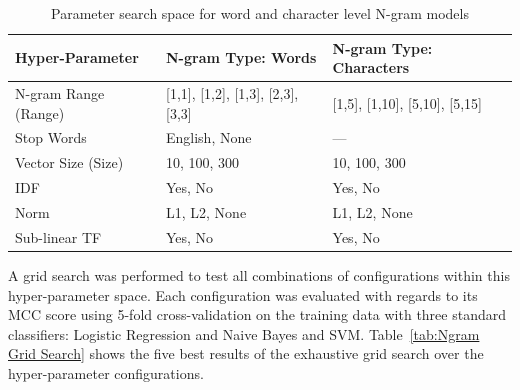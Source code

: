 \begin{table}[h]
  \begin{center}
  \begin{tabular}{ l l l}
    \toprule
    Hyper-Parameter & N-gram Type: Words & N-gram Type: Characters \\
    \midrule
    N-gram Range (Range) & [1,1], [1,2], [1,3], [2,3], [3,3] & [1,5], [1,10], [5,10], [5,15] \\
    Stop Words & English, None & --- \\
    Vector Size (Size) & 10, 100, 300 & 10, 100, 300 \\
    IDF & Yes, No & Yes, No \\
    Norm & L1, L2, None & L1, L2, None \\
    Sub-linear TF & Yes, No & Yes, No \\
    \bottomrule
  \end{tabular}
  \caption{Parameter search space for word and character level N-gram models}
\label{tab:N-gram Hyper-parameters Space}
\end{center}
\end{table}

A grid search was performed to test all combinations of configurations within this hyper-parameter space. Each configuration was evaluated with regards to its \gls{MCC} score using 5-fold cross-validation on the training data with three standard classifiers: Logistic Regression and Naive Bayes and SVM.
Table~\ref{tab:Ngram Grid Search} shows the five best results of the exhaustive grid search over the hyper-parameter configurations.

